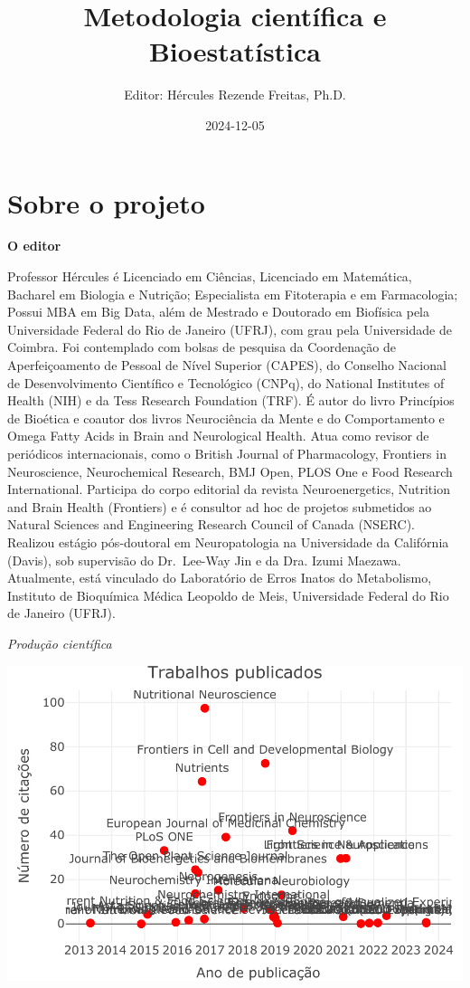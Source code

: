 \documentclass[
]{book}
\title{Metodologia científica e Bioestatística}
\author{Editor: Hércules Rezende Freitas, Ph.D.}
\date{2024-12-05}
\begin{document}
\maketitle

{
\setcounter{tocdepth}{1}
\tableofcontents
}
\chapter{Sobre o projeto}\label{sobre-o-projeto}

\textbf{O editor}

Professor Hércules é Licenciado em Ciências, Licenciado em Matemática, Bacharel em Biologia e Nutrição; Especialista em Fitoterapia e em Farmacologia; Possui MBA em Big Data, além de Mestrado e Doutorado em Biofísica pela Universidade Federal do Rio de Janeiro (UFRJ), com grau pela Universidade de Coimbra. Foi contemplado com bolsas de pesquisa da Coordenação de Aperfeiçoamento de Pessoal de Nível Superior (CAPES), do Conselho Nacional de Desenvolvimento Científico e Tecnológico (CNPq), do National Institutes of Health (NIH) e da Tess Research Foundation (TRF). É autor do livro Princípios de Bioética e coautor dos livros Neurociência da Mente e do Comportamento e Omega Fatty Acids in Brain and Neurological Health. Atua como revisor de periódicos internacionais, como o British Journal of Pharmacology, Frontiers in Neuroscience, Neurochemical Research, BMJ Open, PLOS One e Food Research International. Participa do corpo editorial da revista Neuroenergetics, Nutrition and Brain Health (Frontiers) e é consultor ad hoc de projetos submetidos ao Natural Sciences and Engineering Research Council of Canada (NSERC). Realizou estágio pós-doutoral em Neuropatologia na Universidade da Califórnia (Davis), sob supervisão do Dr.~Lee-Way Jin e da Dra. Izumi Maezawa. Atualmente, está vinculado do Laboratório de Erros Inatos do Metabolismo, Instituto de Bioquímica Médica Leopoldo de Meis, Universidade Federal do Rio de Janeiro (UFRJ).

\emph{Produção científica}

\includegraphics{MCBSbook_files/figure-latex/unnamed-chunk-1-1.pdf}
\end{document}
